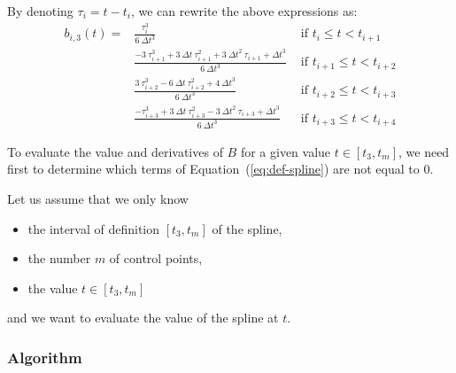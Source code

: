 \documentclass{article}
\begin{document}
By denoting $\tau_i=t-t_i$, we can rewrite the above expressions as:
      \begin{eqnarray*}
      b_{i,3}(t)=& \frac{\tau_i^3}{6\ \Delta t^3} & \mbox{ if } t_{i} \leq t < t_{i+1} \\
      & \frac{-3\ \tau_{i+1}^3 + 3\ \Delta t\ \tau_{i+1}^2 + 3\ \Delta t^2\ \tau_{i+1}+\Delta t^3}{6\ \Delta t^3}& \mbox{ if } t_{i+1} \leq t < t_{i+2} \\
      & \frac{3\ \tau_{i+2}^3-6\ \Delta t\ \tau_{i+2}^2 + 4\ \Delta t^3}{6\ \Delta t^3}& \mbox{ if } t_{i+2} \leq t < t_{i+3} \\
      & \frac{-\tau_{i+3}^3 + 3\ \Delta t\ \tau_{i+3}^2 - 3\ \Delta t^2\ \tau_{i+3} + \Delta t^3 }{6\ \Delta t^3}& \mbox{ if } t_{i+3} \leq t < t_{i+4}
      \end{eqnarray*}

To evaluate the value and derivatives of $B$ for a given value $t\in [t_3,t_m]$, we need first to determine which terms of Equation~(\ref{eq:def-spline}) are not equal to 0.

Let us assume that we only know
\begin{itemize}
  \item the interval of definition $[t_3,t_m]$ of the spline,
  \item the number $m$ of control points,
  \item the value $t\in[t_3,t_m]$
\end{itemize}
and we want to evaluate the value of the spline at $t$.

\subsubsection*{Algorithm}
\end{document}
